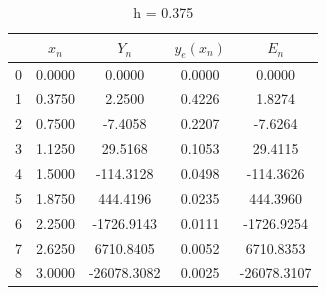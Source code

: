 \documentclass[11pt]{article}
\begin{document}
\begin{table}[H]    
\centering   
\caption{ h = 0.375}
\begin{tabular}{|c|c|c|c|c|}              
\hline                                    
 & $x_{n}$ & $Y_{n} $& $y_{e}(x_{n})$ & $E_{n}$\\             
\hline                                    
0 & 0.0000 & 0.0000 & 0.0000 & 0.0000 \\          
\hline                                            
1 & 0.3750 & 2.2500 & 0.4226 & 1.8274 \\          
\hline                                            
2 & 0.7500 & -7.4058 & 0.2207 & -7.6264 \\        
\hline                                            
3 & 1.1250 & 29.5168 & 0.1053 & 29.4115 \\        
\hline                                            
4 & 1.5000 & -114.3128 & 0.0498 & -114.3626 \\    
\hline                                            
5 & 1.8750 & 444.4196 & 0.0235 & 444.3960 \\      
\hline                                            
6 & 2.2500 & -1726.9143 & 0.0111 & -1726.9254 \\  
\hline                                            
7 & 2.6250 & 6710.8405 & 0.0052 & 6710.8353 \\    
\hline                                            
8 & 3.0000 & -26078.3082 & 0.0025 & -26078.3107 \\
\hline                                                   
\end{tabular}                             
\end{table}
\end{document}
